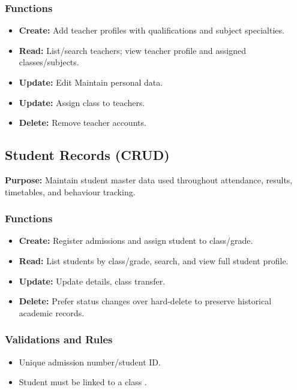 \documentclass[12pt,a4paper]{article}
\begin{document}
\subsubsection*{Functions}
\begin{itemize}[leftmargin=*]
  \item \textbf{Create:} Add teacher profiles with qualifications and subject specialties.
  \item \textbf{Read:} List/search teachers; view teacher profile and assigned classes/subjects.
  \item \textbf{Update:} Edit Maintain personal data. 
  \item \textbf{Update:} Assign class to teachers.
  \item \textbf{Delete:} Remove teacher accounts.
\end{itemize}

\subsection{Student Records (CRUD)}
\textbf{Purpose:} Maintain student master data used throughout attendance, results, timetables, and behaviour tracking.

\subsubsection*{Functions}
\begin{itemize}[leftmargin=*]
  \item \textbf{Create:} Register admissions and assign student to class/grade.
  \item \textbf{Read:} List students by class/grade, search, and view full student profile.
  \item \textbf{Update:} Update details, class transfer.
  \item \textbf{Delete:} Prefer status changes over hard-delete to preserve historical academic records.
\end{itemize}

\subsubsection*{Validations and Rules}
\begin{itemize}[leftmargin=*]
  \item Unique admission number/student ID.
  \item Student must be linked to a class .

\end{itemize}
\end{document}
